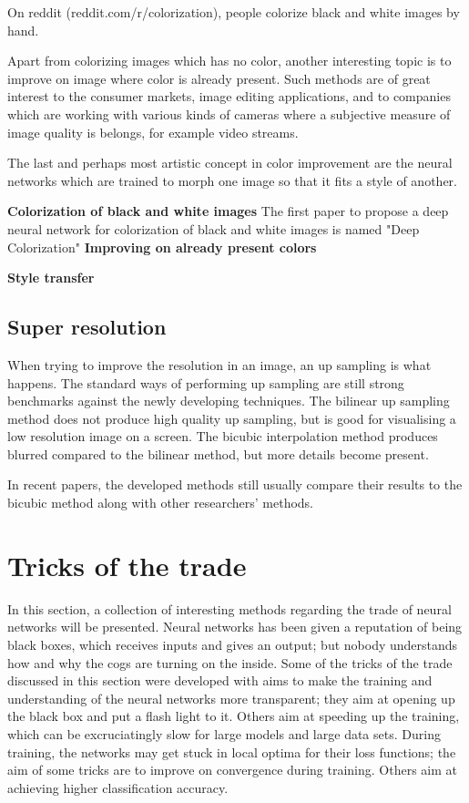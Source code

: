 On reddit (reddit.com/r/colorization), people colorize black and white images by hand.

Apart from colorizing images which has no color, another interesting topic is to improve on image where color is already present. Such methods are of great interest to the consumer markets, image editing applications, and to companies which are working with various kinds of cameras where a subjective measure of image quality is belongs, for example video streams. 

The last and perhaps most artistic concept in color improvement are the neural networks which are trained to morph one image so that it fits a style of another. 


\textbf{Colorization of black and white images}
The first paper to propose a deep neural network for colorization of black and white images is named "Deep Colorization" \citep{2016arXiv160500075C}
\textbf{Improving on already present colors}

\textbf{Style transfer}

\subsection{Super resolution}
When trying to improve the resolution in an image, an up sampling is what happens. The standard ways of performing up sampling are still strong benchmarks against the newly developing techniques. The bilinear up sampling method does not produce high quality up sampling, but is good for visualising a low resolution image on a screen. The bicubic interpolation method produces blurred compared to the bilinear method, but more details become present. 

In recent papers, the developed methods still usually compare their results to the bicubic method along with other researchers' methods.

\section{Tricks of the trade}
In this section, a collection of interesting methods regarding the trade of neural networks will be presented. Neural networks has been given a reputation of being black boxes, which receives inputs and gives an output; but nobody understands how and why the cogs are turning on the inside. Some of the tricks of the trade discussed in this section were developed with aims to make the training and understanding of the neural networks more transparent; they aim at opening up the black box and put a flash light to it. Others aim at speeding up the training, which can be excruciatingly slow for large models and large data sets. During training, the networks may get stuck in local optima for their loss functions; the aim of some tricks are to improve on convergence during training. Others aim at achieving higher classification accuracy. 

